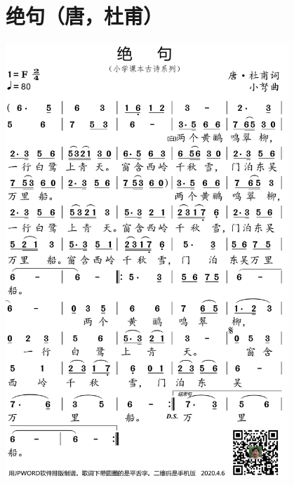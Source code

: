 \documentclass[cn,pad,twocol]{elegantbook}
\begin{document}
\section{绝句（唐，杜甫）}
    \includegraphics[width=0.8\textwidth]{dongxiao/20200627-古诗-杜甫-绝句.jpg}   
\end{document}
